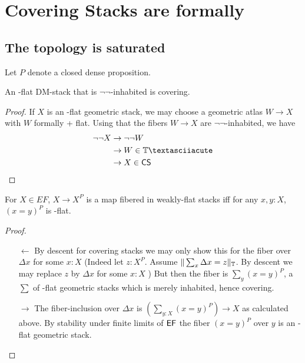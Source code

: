 \section{Covering Stacks are formally \etale}
\subsection{The \etale topology is saturated}
Let $P$ denote a closed dense proposition.
\begin{lemma}{\label{lemma:covOfEF}}
	An \etale-flat DM-stack that is $\lnot \lnot$-inhabited is covering.
\end{lemma}
\begin{proof}
	If $X$ is an \etale-flat geometric stack, we may choose a geometric atlas $W \to X$ with $W$ formally \etale + flat. Using that the fibers $W \to X$ are $\lnot \lnot$-inhabited, we have 
	\begin{align*}
		\lnot \lnot X &\to \lnot \lnot W \\
		&\to W \in \bT  ´\\
		&\to X \in \CS \\
	\end{align*}
\end{proof}
\begin{lemma}{\label{lemma:wfcover}}
	For $X \in EF$, $X \to X^P$ is a map fibered in weakly-flat stacks iff for any $x, y : X$, $(x = y)^P$ is \etale-flat.
\end{lemma}
\begin{proof}
	\begin{itemize}
		
		\item[$\leftarrow$]
		By descent for covering stacks we may only show this for the fiber over $\Delta x $ for some $x  : X$ (Indeed let $z : X^P$. Assume $\|\sum_x \Delta x = z \|_{\mathbb{T}}$. By descent we may replace $z$ by $\Delta x$ for some $x : X$ ) 
		But then the fiber is $\sum_y (x = y)^P$, a $\sum$ of \etale-flat geometric stacks which is merely inhabited, hence covering.
		\item[$\rightarrow$]The fiber-inclusion over $\Delta x$ is $(\sum_{y : X} (x = y)^P) \to X$ as calculated above. By stability under finite limits of $\mathsf{EF}$ the fiber $(x = y)^P$ over $y$ is an \etale-flat geometric stack.
	\end{itemize}
\end{proof}
